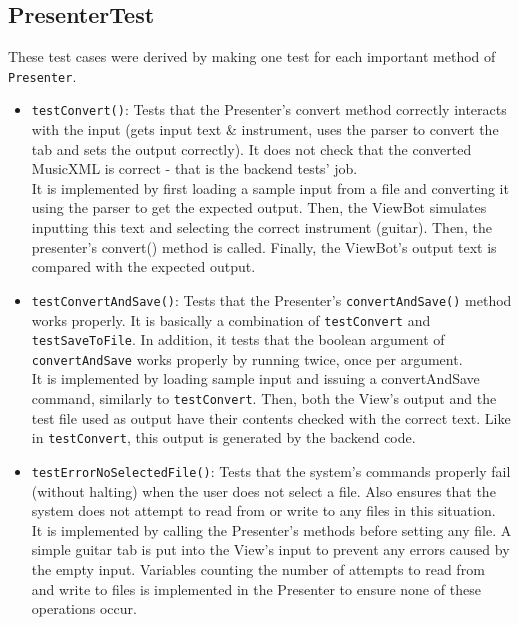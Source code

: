 \documentclass[11pt]{article}
\begin{document}
\subsection{PresenterTest}
\label{sec:orgbf01cca}
These test cases were derived by making one test for each important method of \texttt{Presenter}.\\
\begin{itemize}
\item \texttt{testConvert()}: Tests that the Presenter's convert method correctly interacts with the input (gets input text \& instrument, uses the parser to convert the tab and sets the output correctly).  It does not check that the converted MusicXML is correct - that is the backend tests' job.\\
It is implemented by first loading a sample input from a file and converting it using the parser to get the expected output.  Then, the ViewBot simulates inputting this text and selecting the correct instrument (guitar).  Then, the presenter's convert() method is called.  Finally, the ViewBot's output text is compared with the expected output.\\
\item \texttt{testConvertAndSave()}: Tests that the Presenter's \texttt{convertAndSave()} method works properly.  It is basically a combination of \texttt{testConvert} and \texttt{testSaveToFile}.  In addition, it tests that the boolean argument of \texttt{convertAndSave} works properly by running twice, once per argument.\\
It is implemented by loading sample input and issuing a convertAndSave command, similarly to \texttt{testConvert}.  Then, both the View's output and the test file used as output have their contents checked with the correct text.  Like in \texttt{testConvert}, this output is generated by the backend code.\\
\item \texttt{testErrorNoSelectedFile()}: Tests that the system's commands properly fail (without halting) when the user does not select a file.  Also ensures that the system does not attempt to read from or write to any files in this situation.\\
It is implemented by calling the Presenter's methods before setting any file.  A simple guitar tab is put into the View's input to prevent any errors caused by the empty input.  Variables counting the number of attempts to read from and write to files is implemented in the Presenter to ensure none of these operations occur.\\

\end{itemize}
\end{document}

